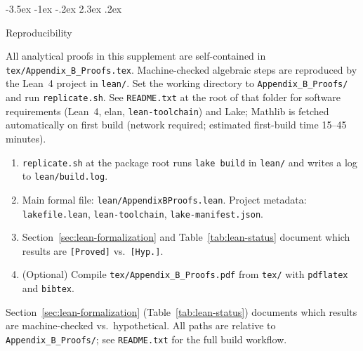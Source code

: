 \documentclass[12pt]{article}
\makeatletter
\numberwithin{equation}{section}
\numberwithin{table}{section}
\theoremstyle{definition}
\renewcommand\section{\@startsection {section}{1}{\z@}%
                                   {-3.5ex \@plus -1ex \@minus -.2ex}%
                                   {2.3ex \@plus.2ex}%
                                   {\normalfont\Large\bfseries\raggedright}}
\makeatother
\begin{document}
\section{Reproducibility}
\label{sec:repro}

\begin{sloppypar}
All analytical proofs in this supplement are self-contained in
\texttt{tex/Appendix\_B\_Proofs.tex}. Machine-checked algebraic steps are reproduced by
the Lean~4 project in \texttt{lean/}. Set the working directory to
\texttt{Appendix\_B\_Proofs/} and run \texttt{replicate.sh}. See \texttt{README.txt} at the
root of that folder for software requirements (Lean~4, elan,
\texttt{lean-toolchain}) and Lake; Mathlib is fetched automatically on first
build (network required; estimated first-build time 15--45 minutes).
\end{sloppypar}

\begin{enumerate}
\item \texttt{replicate.sh} at the package root runs \texttt{lake build} in
  \texttt{lean/} and writes a log to \texttt{lean/build.log}.
\item Main formal file: \texttt{lean/AppendixBProofs.lean}. Project metadata:
  \texttt{lakefile.lean}, \texttt{lean-toolchain}, \texttt{lake-manifest.json}.
\item Section~\ref{sec:lean-formalization} and Table~\ref{tab:lean-status}
  document which results are \texttt{[Proved]} vs.\ \texttt{[Hyp.]}.
\item (Optional) Compile \texttt{tex/Appendix\_B\_Proofs.pdf} from \texttt{tex/} with
  \texttt{pdflatex} and \texttt{bibtex}.
\end{enumerate}

\begin{sloppypar}
Section~\ref{sec:lean-formalization} (Table~\ref{tab:lean-status}) documents
which results are machine-checked vs.\ hypothetical. All paths are relative to
\texttt{Appendix\_B\_Proofs/}; see \texttt{README.txt} for the full build workflow.
\end{sloppypar}



\end{document}

